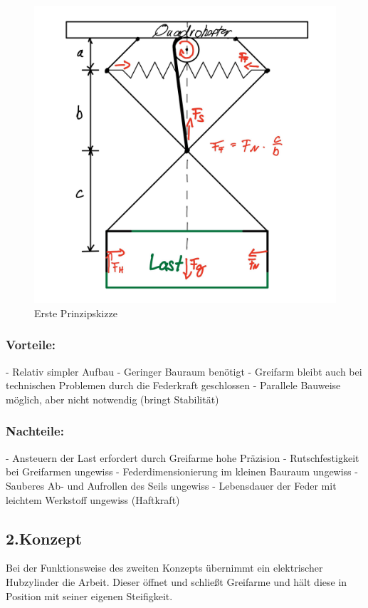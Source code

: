 \begin{figure}
\begin{center}
\includegraphics[scale=0.5]{Grafiken/Skizze1mechanik.jpg}
\caption{Erste Prinzipskizze}
\label{erste_prinzipskizze}
\end{center}
\end{figure}

\subsubsection{Vorteile:}
-	Relativ simpler Aufbau
-	Geringer Bauraum benötigt
-	Greifarm bleibt auch bei technischen Problemen durch die Federkraft geschlossen
-	Parallele Bauweise möglich, aber nicht notwendig (bringt Stabilität) 

\subsubsection{Nachteile:}
-	Ansteuern der Last erfordert durch Greifarme hohe Präzision
-	Rutschfestigkeit bei Greifarmen ungewiss
-	Federdimensionierung im kleinen Bauraum ungewiss
-	Sauberes Ab- und Aufrollen des Seils ungewiss
-	Lebensdauer der Feder mit leichtem Werkstoff ungewiss (Haftkraft)

\subsection{2.Konzept}
Bei der Funktionsweise des zweiten Konzepts übernimmt ein elektrischer Hubzylinder die Arbeit. Dieser öffnet und schließt Greifarme und hält diese in Position mit seiner eigenen Steifigkeit.

